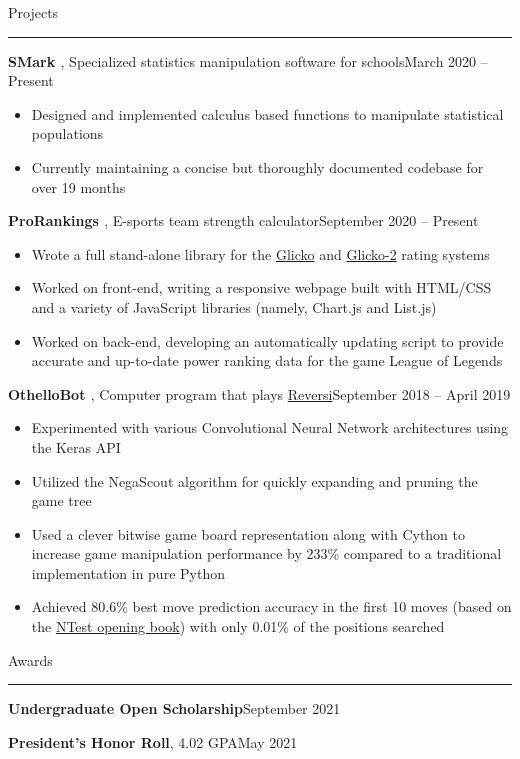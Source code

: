 \documentclass{article}
\newcommand{\entrytitlesimple}[2]{\vspace{0.5em}\textbf{#1}\hfill #2}
\newcommand{\entrytitleskip}{\par\vspace{-0.7em}}
\newcommand{\entrytitle}[3]{\vspace{0.5em}\textbf{#1}, #2\hfill #3}
\renewcommand{\section}[1]{\vspace{0.5em}\Large{#1}\vspace{0.3em}\hrule\normalsize{}}
\newenvironment{entrybody}{\begin{itemize}[itemsep=0.3em]}{\end{itemize}}
\begin{document}
\section{Projects}

\entrytitle{SMark \href{https://github.com/xtevenx/SMark}{\faGithub}} %
    {Specialized statistics manipulation software for schools}{March 2020 – Present}
\begin{entrybody}
\item Designed and implemented calculus based functions to manipulate statistical populations
\item Currently maintaining a concise but thoroughly documented codebase for over 19 months
\end{entrybody}

\entrytitle{ProRankings \href{https://xtevenx.github.io/ProRankings/}{\faGithub}} %
    {E-sports team strength calculator}{September 2020 – Present}
\begin{entrybody}
\item
    Wrote a full stand-alone library for the \href{http://www.glicko.net/glicko/glicko.pdf}{Glicko}
    and \href{http://www.glicko.net/glicko/glicko2.pdf}{Glicko-2} rating systems
\item
    Worked on front-end, writing a responsive webpage built with HTML/CSS and a variety of
    JavaScript libraries (namely, Chart.js and List.js)
\item
    Worked on back-end, developing an automatically updating script to provide accurate and
    up-to-date power ranking data for the game League of Legends
\end{entrybody}

\entrytitle{OthelloBot \href{https://github.com/xtevenx/othello-bot}{\faGithub}} %
    {Computer program that plays \href{https://en.wikipedia.org/wiki/Reversi}{Reversi}}{September 2018 – April 2019}
\begin{entrybody}
\item Experimented with various Convolutional Neural Network architectures using the Keras API
\item Utilized the NegaScout algorithm for quickly expanding and pruning the game tree
\item  %
    Used a clever bitwise game board representation along with Cython to increase game manipulation
    performance by 233\% compared to a traditional implementation in pure Python
\item  %
    Achieved 80.6\% best move prediction accuracy in the first 10 moves (based on the \href{http://www.orbanova.com/nbook}{NTest opening book})
    with only 0.01\% of the positions searched
\end{entrybody}


\section{Awards}

\entrytitlesimple{Undergraduate Open Scholarship}{September 2021} \entrytitleskip
\entrytitle{President's Honor Roll}{4.02 GPA}{May 2021}
\end{document}
